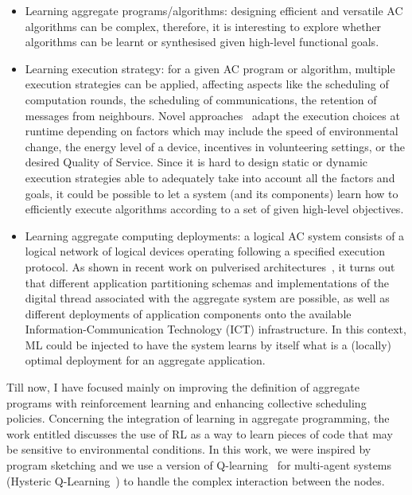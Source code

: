 \documentclass[11pt]{article}
\begin{document}
\begin{itemize}
	\item Learning aggregate programs/algorithms: designing efficient and versatile AC algorithms can be complex, 
	therefore, it is interesting to explore whether algorithms can be learnt or synthesised given high-level functional goals.
	
	\item Learning execution strategy: for a given AC program or algorithm, 
	 multiple execution strategies can be applied, 
	 affecting aspects like the scheduling
	 of computation rounds, 
	 the scheduling of communications, 
	 the retention of messages from neighbours. 
	Novel approaches~\cite{zambonelli2021time} 
	 adapt the execution choices at runtime 
	 depending on factors which may include the speed of environmental change, 
	 the energy level of a device, incentives in volunteering settings, 
	 or the desired Quality of Service.
	Since it is hard to design static
	 or dynamic execution strategies able 
	 to adequately take into account all the factors and goals, 
	 it could be possible to let a system (and its components) 
	 learn how to efficiently execute algorithms according 
	 to a set of given high-level objectives.
	
	\item Learning aggregate computing deployments: a logical AC system consists of a logical network of
	 logical devices operating following a specified execution protocol. 
	As shown in recent work on pulverised architectures~\cite{Casadei2020}, 
	 it turns out that different application partitioning schemas and implementations of the digital thread associated 
	 with the aggregate system are possible, 
	 as well as different deployments of application components onto the available Information-Communication Technology (ICT) infrastructure. 
	In this context, ML could be injected to have 
	 the system learns by itself what is a (locally) optimal deployment 
	 for an aggregate application.
\end{itemize}
Till now, I have focused mainly on improving 
 the definition of aggregate programs with reinforcement learning 
 and enhancing collective scheduling policies.
%
Concerning the integration of learning in aggregate programming, the work 
 entitled \textit{} 
 discusses the use of RL as a way to learn pieces of code 
 that may be sensitive to environmental conditions. 
In this work, we were inspired by program sketching 
 and we use a version of Q-learning~\cite{watkins1992q} for multi-agent systems (Hysteric Q-Learning~\cite{matignon2007hysteretic})
 to handle the complex interaction between the nodes. 
 
\end{document}
